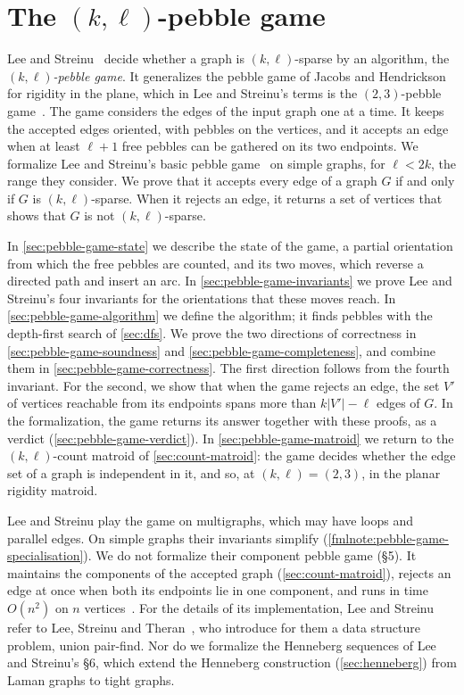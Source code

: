 \section{The \texorpdfstring{$(k, \ell)$}{(k, l)}-pebble game}
\label{sec:pebble-game}

Lee and Streinu~\cite{leeStreinu2008} decide whether a graph is
$(k, \ell)$-sparse by an algorithm, the \emph{$(k, \ell)$-pebble game}.
It generalizes the pebble game of Jacobs and
Hendrickson~\cite{jacobsHendrickson1997} for rigidity in the plane,
which in Lee and Streinu's terms is the $(2, 3)$-pebble
game~\cite[p.~1426]{leeStreinu2008}. The game considers the edges of
the input graph one at a time. It keeps the accepted edges oriented,
with pebbles on the vertices, and it accepts an edge when at least
$\ell + 1$ free pebbles can be gathered on its two endpoints. We
formalize Lee and Streinu's basic pebble
game~\cite[\S 3]{leeStreinu2008} on simple graphs, for $\ell < 2k$, the
range they consider. We prove that it accepts every edge of a graph $G$
if and only if $G$ is $(k, \ell)$-sparse. When it rejects an edge, it
returns a set of vertices that shows that $G$ is not $(k, \ell)$-sparse.

In \cref{sec:pebble-game-state} we describe the state of the game, a
partial orientation from which the free pebbles are counted, and its
two moves, which reverse a directed path and insert an arc. In
\cref{sec:pebble-game-invariants} we prove Lee and Streinu's four
invariants for the orientations that these moves reach. In
\cref{sec:pebble-game-algorithm} we define the algorithm; it finds
pebbles with the depth-first search of \cref{sec:dfs}. We prove the two
directions of correctness in \cref{sec:pebble-game-soundness} and
\cref{sec:pebble-game-completeness}, and combine them in
\cref{sec:pebble-game-correctness}. The first direction follows from the
fourth invariant. For the second, we show that when the game rejects an
edge, the set $V'$ of vertices reachable from its endpoints spans more
than $k|V'| - \ell$ edges of $G$. In the formalization, the game
returns its answer together with these proofs, as a verdict
(\cref{sec:pebble-game-verdict}). In
\cref{sec:pebble-game-matroid} we return to the $(k, \ell)$-count
matroid of \cref{sec:count-matroid}: the game decides whether the edge
set of a graph is independent in it, and so, at $(k, \ell) = (2, 3)$,
in the planar rigidity matroid.

Lee and Streinu play the game on multigraphs, which may have loops and
parallel edges. On simple graphs their invariants simplify
(\cref{fmlnote:pebble-game-specialisation}). We do not formalize their
component pebble game (\S 5). It maintains the components of the
accepted graph (\cref{sec:count-matroid}), rejects an edge at once when
both its endpoints lie in one component, and runs in time $O(n^2)$ on
$n$ vertices~\cite[p.~1436]{leeStreinu2008}. For the details of its
implementation, Lee and Streinu refer to Lee, Streinu and
Theran~\cite{leeStreinuTheran2005}, who introduce for them a data
structure problem, union pair-find. Nor do we
formalize the Henneberg sequences of Lee and Streinu's \S 6, which
extend the Henneberg construction (\cref{sec:henneberg}) from Laman
graphs to tight graphs.

